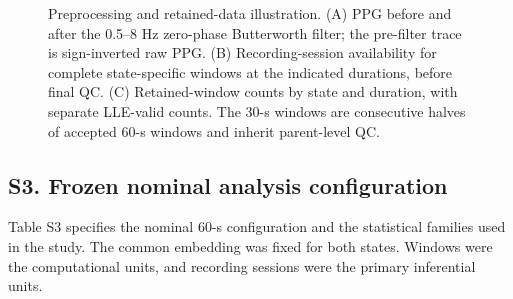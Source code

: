 \begin{figure}[p]
\centering
\caption{Preprocessing and retained-data illustration. (A) PPG before and after the 0.5--8 Hz zero-phase Butterworth filter; the pre-filter trace is sign-inverted raw PPG. (B) Recording-session availability for complete state-specific windows at the indicated durations, before final QC. (C) Retained-window counts by state and duration, with separate LLE-valid counts. The 30-s windows are consecutive halves of accepted 60-s windows and inherit parent-level QC.}
\label{fig:supp_qc}
\end{figure}

\subsection*{S3. Frozen nominal analysis configuration}

Table S3 specifies the nominal 60-s configuration and the statistical families used in the study. The common embedding was fixed for both states. Windows were the computational units, and recording sessions were the primary inferential units.

